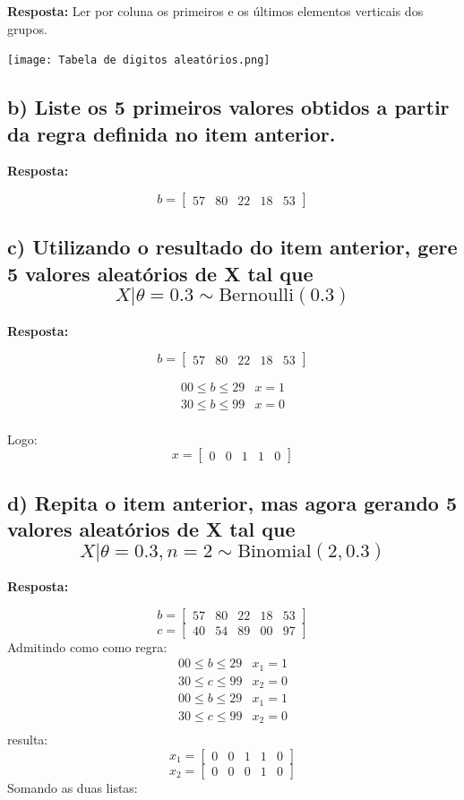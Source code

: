 \documentclass{article}
\begin{document}
\textbf{Resposta:}
Ler por coluna os primeiros e os últimos elementos verticais dos grupos.

\texttt{[image: Tabela de digitos aleatórios.png]}

\subsection*{b) Liste os 5 primeiros valores obtidos a partir da regra definida no item anterior.}
\textbf{Resposta:}


\[
b = \begin{bmatrix}
57 & 80 & 22 & 18 & 53
\end{bmatrix}
\]
\subsection*{c) Utilizando o resultado do item anterior, gere 5 valores aleatórios de X tal que 
\[
X | \theta = 0.3 \sim \text{Bernoulli}(0.3)
\]}

\textbf{Resposta:}

\[
b = \begin{bmatrix}
57 & 80 & 22 & 18 & 53
\end{bmatrix}
\]

\[
\begin{array}{ll}
00 \leq b \leq 29 & x = 1 \\
30 \leq b \leq 99 & x = 0 \\
\end{array}
\]

Logo:
\[
x = \begin{bmatrix}
0 & 0 & 1 & 1 & 0
\end{bmatrix}
\]

\subsection*{d) Repita o item anterior, mas agora gerando 5 valores aleatórios de X tal que
\[
X| \theta = 0.3, n = 2 \sim \text{Binomial}(2, 0.3)
\]}

\textbf{Resposta:}


\[
b = \begin{bmatrix}
57 & 80 & 22 & 18 & 53
\end{bmatrix}
\]
\[
c = \begin{bmatrix}
40 & 54 & 89 & 00 & 97
\end{bmatrix}
\]
Admitindo como como regra:
\[
\begin{array}{ll}
00 \leq b \leq 29 & x_1 = 1 \\
30 \leq c \leq 99 & x_2 = 0 \\        
00 \leq b \leq 29 & x_1 = 1 \\
30 \leq c \leq 99 & x_2 = 0 \\
\end{array}
\]
resulta:
\[
x_1 = \begin{bmatrix}
0 & 0 & 1 & 1 & 0
\end{bmatrix}
\]
\[
x_2 = \begin{bmatrix}
0 & 0 & 0 & 1 & 0
\end{bmatrix}
\]
Somando as duas listas:
\end{document}
